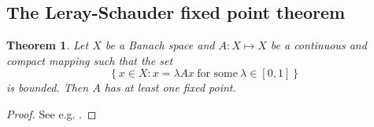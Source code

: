 \documentclass[10pt,a4paper]{article}
\newtheorem{theorem}{Theorem}[section]
\newtheorem{lemma}[theorem]{Lemma}
\numberwithin{equation}{section}
\begin{document}
\subsection{The Leray-Schauder  fixed point theorem}\label{thm:leray-schauder}
\begin{theorem}\label{thm:Schaeffer}
Let $X$ be a Banach space and   $A :  X \mapsto X$ be a continuous and compact mapping such that the set \[\left\{ x\in X:x=\lambda Ax\ \text{for some}\ \lambda\in\left[0,1\right]\right\} \]
is bounded. Then $A$ has at least one fixed point.
\end{theorem}
\begin{proof}
    See e.g. \cite[Theorem 4]{Ev10}.
\end{proof}
\end{document}
